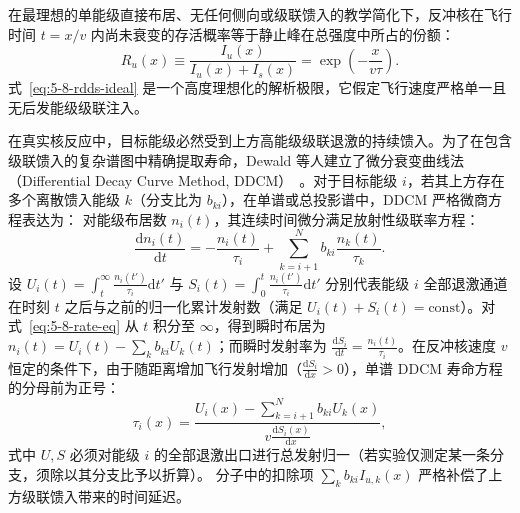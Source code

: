 在最理想的单能级直接布居、无任何侧向或级联馈入的教学简化下，反冲核在飞行时间 $t = x/v$ 内尚未衰变的存活概率等于静止峰在总强度中所占的份额：
\begin{equation}\label{eq:5-8-rdds-ideal}
R_u(x) \equiv \frac{I_u(x)}{I_u(x) + I_s(x)} = \exp\left( - \frac{x}{v \tau} \right).
\end{equation}
式~\eqref{eq:5-8-rdds-ideal} 是一个高度理想化的解析极限，它假定飞行速度严格单一且无后发能级级联注入。

在真实核反应中，目标能级必然受到上方高能级级联退激的持续馈入。为了在包含级联馈入的复杂谱图中精确提取寿命，Dewald 等人建立了微分衰变曲线法（Differential Decay Curve Method, DDCM）~\cite{dewald-2012-ddcm-recoil-distance}。对于目标能级 $i$，若其上方存在多个离散馈入能级 $k$（分支比为 $b_{ki}$），在单谱或总投影谱中，DDCM 严格微商方程表达为：
对能级布居数 $n_i(t)$，其连续时间微分满足放射性级联率方程：
\begin{equation}\label{eq:5-8-rate-eq}
\frac{\mathrm{d}n_i(t)}{\mathrm{d}t} = -\frac{n_i(t)}{\tau_i} + \sum_{k=i+1}^N b_{ki} \frac{n_k(t)}{\tau_k}.
\end{equation}
设 $U_i(t) = \int_t^\infty \frac{n_i(t')}{\tau_i} \mathrm{d}t'$ 与 $S_i(t) = \int_0^t \frac{n_i(t')}{\tau_i} \mathrm{d}t'$ 分别代表能级 $i$ 全部退激通道在时刻 $t$ 之后与之前的归一化累计发射数（满足 $U_i(t) + S_i(t) = \text{const}$）。对式~\eqref{eq:5-8-rate-eq} 从 $t$ 积分至 $\infty$，得到瞬时布居为 $n_i(t) = U_i(t) - \sum_k b_{ki} U_k(t)$；而瞬时发射率为 $\frac{\mathrm{d}S_i}{\mathrm{d}t} = \frac{n_i(t)}{\tau_i}$。在反冲核速度 $v$ 恒定的条件下，由于随距离增加飞行发射增加（$\frac{\mathrm{d}S_i}{\mathrm{d}x} > 0$），单谱 DDCM 寿命方程的分母前为正号：
\begin{equation}\label{eq:5-8-ddcm-singles}
\tau_i(x) = \frac{U_i(x) - \sum_{k=i+1}^N b_{ki} U_k(x)}{v \frac{\mathrm{d} S_i(x)}{\mathrm{d}x}},
\end{equation}
式中 $U, S$ 必须对能级 $i$ 的全部退激出口进行总发射归一（若实验仅测定某一条分支，须除以其分支比予以折算）。
分子中的扣除项 $\sum_k b_{ki} I_{u, k}(x)$ 严格补偿了上方级联馈入带来的时间延迟。

